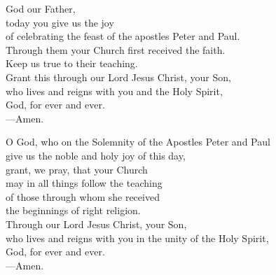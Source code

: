 \prayer


\begin{prayerverse}
God our Father,\\
today you give us the joy\\
of celebrating the feast of the apostles Peter and Paul.\\
Through them your Church first received the faith.\\
Keep us true to their teaching.\\
Grant this through our Lord Jesus Christ, your Son,\\
who lives and reigns with you and the Holy Spirit,\\
God, for ever and ever.\\
{\color{red}---\thinspace}Amen.
\end{prayerverse}


\begin{prayerverse}
O God, who on the Solemnity of the Apostles Peter and Paul\\
give us the noble and holy joy of this day,\\
grant, we pray, that your Church\\
may in all things follow the teaching\\
of those through whom she received\\
the beginnings of right religion.\\
Through our Lord Jesus Christ, your Son,\\
who lives and reigns with you in the unity of the Holy Spirit,\\
God, for ever and ever.\\
{\color{red}---\thinspace}Amen.
\end{prayerverse}

